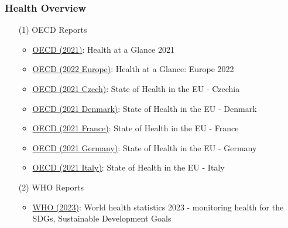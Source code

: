 \documentclass[12pt]{article}
\begin{document}
\subsubsection{Health Overview}
\begin{itemize}
    \item[(1)] OECD Reports
    \begin{itemize}
        \item \href{https://www.oecd-ilibrary.org/social-issues-migration-health/health-at-a-glance-2021_ae3016b9-en}{OECD (2021)}: Health at a Glance 2021
        \item \href{https://www.oecd-ilibrary.org/social-issues-migration-health/health-at-a-glance-europe-2022_507433b0-en}{OECD (2022 Europe)}: Health at a Glance: Europe 2022 
        \item \href{https://health.ec.europa.eu/state-health-eu/country-health-profiles_en}{OECD (2021 Czech)}: State of Health in the EU - Czechia
        \item \href{https://health.ec.europa.eu/state-health-eu/country-health-profiles_en}{OECD (2021 Denmark)}: State of Health in the EU - Denmark
        \item \href{https://health.ec.europa.eu/state-health-eu/country-health-profiles_en}{OECD (2021 France)}: State of Health in the EU - France
        \item \href{https://health.ec.europa.eu/state-health-eu/country-health-profiles_en}{OECD (2021 Germany)}: State of Health in the EU - Germany
        \item \href{https://health.ec.europa.eu/state-health-eu/country-health-profiles_en}{OECD (2021 Italy)}: State of Health in the EU - Italy        
    \end{itemize}
    \item[(2)] WHO Reports
    \begin{itemize}
        \item \href{https://reliefweb.int/report/world/world-health-statistics-2023-monitoring-health-sdgs-sustainable-development-goals?gclid=Cj0KCQjwxuCnBhDLARIsAB-cq1qcRkffnlyozCmjDNz91fun7V2z_bovggRvfVxIf2BG5SrdTWJWVZ0aAme-EALw_wcB}{WHO (2023)}: World health statistics 2023 - monitoring health for the SDGs, Sustainable Development Goals
    \end{itemize}
\end{itemize}
\end{document}
